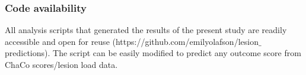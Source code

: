 \documentclass[phd,tocprelim]{cornell}
\begin{document}
\subsubsection*{Code availability}
All analysis scripts that generated the results of the present study are readily accessible and open for reuse (https://github.com/emilyolafson/lesion$\_$predictions). The script can be easily modified to predict any outcome score from ChaCo scores/lesion load data.


\label{chap:3}


\end{document}
